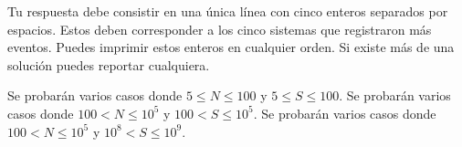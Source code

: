 \documentclass{oci}
\begin{document}
\begin{outputDescription}
  Tu respuesta debe consistir en una única línea con cinco enteros separados por espacios.
  Estos deben corresponder a los cinco sistemas que registraron más eventos.
  Puedes imprimir estos enteros en cualquier orden.
  Si existe más de una solución puedes reportar cualquiera.
\end{outputDescription}

\begin{scoreDescription}
   Se probarán varios casos donde $5 \le N \le 100$ y $5 \le S \le 100$.
   Se probarán varios casos donde $100 < N \le 10^5$ y $100 < S \le 10^5$.
   Se probarán varios casos donde $100 < N \le 10^5$ y $10^8 < S \le 10^9$.
\end{scoreDescription}

\begin{sampleDescription}
\end{sampleDescription}
\end{document}
